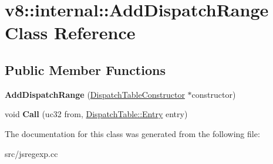 \hypertarget{classv8_1_1internal_1_1_add_dispatch_range}{}\section{v8\+:\+:internal\+:\+:Add\+Dispatch\+Range Class Reference}
\label{classv8_1_1internal_1_1_add_dispatch_range}
\subsection*{Public Member Functions}
\begin{DoxyCompactItemize}
\item 
\hypertarget{classv8_1_1internal_1_1_add_dispatch_range_aabb3eb748f5a566349ae5946fef1103b}{}{\bfseries Add\+Dispatch\+Range} (\hyperlink{classv8_1_1internal_1_1_dispatch_table_constructor}{Dispatch\+Table\+Constructor} $\ast$constructor)\label{classv8_1_1internal_1_1_add_dispatch_range_aabb3eb748f5a566349ae5946fef1103b}

\item 
\hypertarget{classv8_1_1internal_1_1_add_dispatch_range_a17e1406e159be04ef2b1fcc36d94c888}{}void {\bfseries Call} (uc32 from, \hyperlink{classv8_1_1internal_1_1_dispatch_table_1_1_entry}{Dispatch\+Table\+::\+Entry} entry)\label{classv8_1_1internal_1_1_add_dispatch_range_a17e1406e159be04ef2b1fcc36d94c888}

\end{DoxyCompactItemize}


The documentation for this class was generated from the following file\+:\begin{DoxyCompactItemize}
\item 
src/jsregexp.\+cc\end{DoxyCompactItemize}
